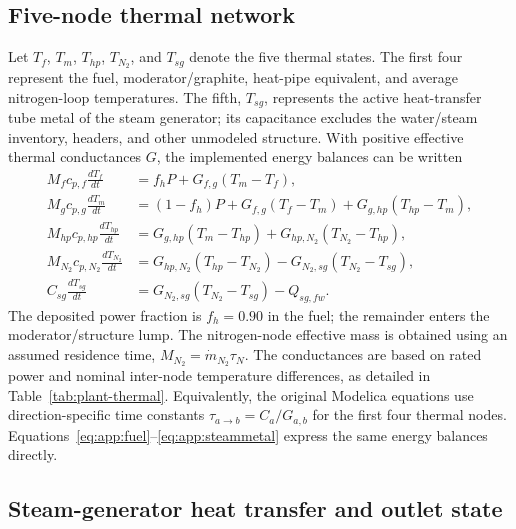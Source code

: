 \subsection{Five-node thermal network}

Let $T_f$, $T_m$, $T_{hp}$, $T_{N_2}$, and $T_{sg}$ denote the five thermal states. The first four represent the fuel, moderator/graphite, heat-pipe equivalent, and average nitrogen-loop temperatures. The fifth, $T_{sg}$, represents the active heat-transfer tube metal of the steam generator; its capacitance excludes the water/steam inventory, headers, and other unmodeled structure. With positive effective thermal conductances $G$, the implemented energy balances can be written
\begin{align}
 M_fc_{p,f}\frac{dT_f}{dt}
 &=f_hP+G_{f,g}(T_m-T_f),
 \label{eq:app:fuel}\\
 M_gc_{p,g}\frac{dT_m}{dt}
 &=(1-f_h)P+G_{f,g}(T_f-T_m)
     +G_{g,hp}(T_{hp}-T_m),
 \label{eq:app:moderator}\\
 M_{hp}c_{p,hp}\frac{dT_{hp}}{dt}
 &=G_{g,hp}(T_m-T_{hp})
     +G_{hp,N_2}(T_{N_2}-T_{hp}),
 \label{eq:app:heatpipe}\\
 M_{N_2}c_{p,N_2}\frac{dT_{N_2}}{dt}
 &=G_{hp,N_2}(T_{hp}-T_{N_2})
     -G_{N_2,sg}(T_{N_2}-T_{sg}),
 \label{eq:app:nitrogen}\\
 C_{sg}\frac{dT_{sg}}{dt}
 &=G_{N_2,sg}(T_{N_2}-T_{sg})-Q_{sg,fw}.
 \label{eq:app:steammetal}
\end{align}
The deposited power fraction is $f_h=0.90$ in the fuel; the remainder enters the moderator/structure lump. The nitrogen-node effective mass is obtained using an assumed residence time, $M_{N_2}=\dot m_{N_2}\tau_N$. The conductances are based on rated power and nominal inter-node temperature differences, as detailed in Table~\ref{tab:plant-thermal}. Equivalently, the original Modelica equations use direction-specific time constants $\tau_{a\to b}=C_a/G_{a,b}$ for the first four thermal nodes. Equations~\eqref{eq:app:fuel}--\eqref{eq:app:steammetal} express the same energy balances directly.

\subsection{Steam-generator heat transfer and outlet state}

